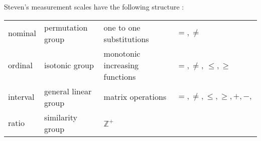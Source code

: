 Steven's measurement scales have the following structure \cite{stevensTheoryScalesMeasurement1946}:
\begin{table}
    \begin{tabular}{l l l l}
        nominal & permutation group & one to one substitutions & $=, \neq $\\
        ordinal & isotonic group & monotonic increasing functions &  $=, \neq $, $\leq, \geq$\\
        interval & general linear group & matrix operations &  $=, \neq, \leq, \geq, +, -, $\\
        ratio & similarity group & $ \mathbb{Z}^+ $ & 
    \end{tabular}
\end{table}


